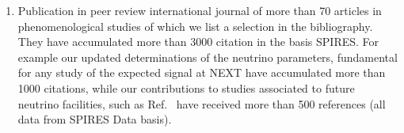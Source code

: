 \begin{enumerate}
\item Publication in peer review international journal 
of more than 70 articles in phenomenological studies of which 
we list a selection in the
bibliography. They have accumulated more than 3000 citation  in the
basis SPIRES. For example our updated determinations of the neutrino 
parameters, fundamental for any study of the expected signal at NEXT
\cite{Gonzalez-Garcia:2014bfa,GonzalezGarcia:2012sz,GonzalezGarcia:2010er} 
have accumulated more than 1000 citations,  
while our contributions to studies associated to future neutrino facilities,
such as Ref.~\cite{Bandyopadhyay:2007kx,Abazajian:2012ys,Choubey:2011zzq,Adey:2014rfv} have received more than 500 references (all data from SPIRES
Data basis).
\end{enumerate}

%
